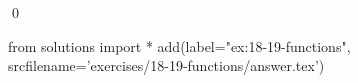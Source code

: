 
\begin{ex}
  \label{ex:18-19-functions}
  
  \qed
\end{ex}
\begin{python0}
from solutions import *
add(label="ex:18-19-functions",
    srcfilename='exercises/18-19-functions/answer.tex')
\end{python0}
